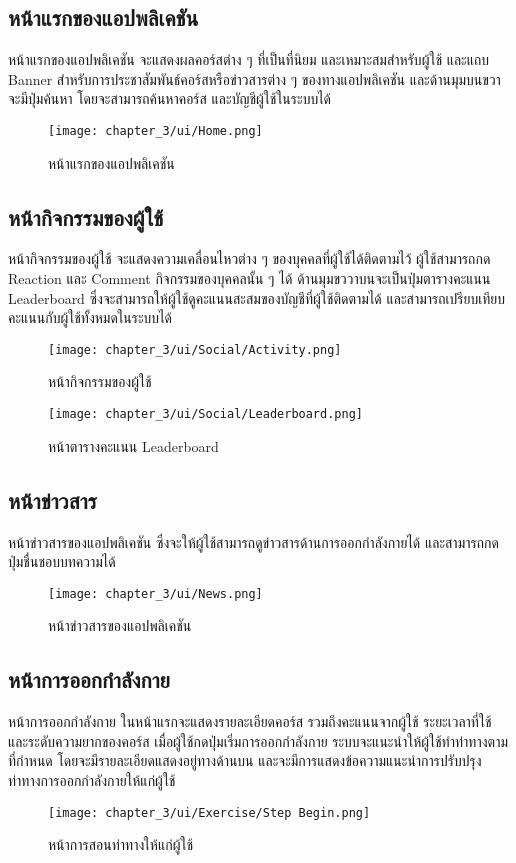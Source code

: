 \subsection{หน้าแรกของแอปพลิเคชัน}
หน้าแรกของแอปพลิเคชัน จะแสดงผลคอร์สต่าง ๆ ที่เป็นที่นิยม และเหมาะสมสำหรับผู้ใช้ และแถบ Banner สำหรับการประชาสัมพันธ์คอร์สหรือข่าวสารต่าง ๆ ของทางแอปพลิเคชัน และด้านมุมบนขวาจะมีปุ่มค้นหา โดยจะสามารถค้นหาคอร์ส และบัญชีผู้ใช้ในระบบได้
\begin{figure}
    \texttt{[image: chapter\_3/ui/Home.png]}
    \caption{หน้าแรกของแอปพลิเคชัน}
\end{figure}

\subsection{หน้ากิจกรรมของผู้ใช้}
หน้ากิจกรรมของผู้ใช้ จะแสดงความเคลื่อนไหวต่าง ๆ ของบุคคลที่ผู้ใช้ได้ติดตามไว้ ผู้ใช้สามารถกด Reaction และ Comment กิจกรรมของบุคคลนั้น ๆ ได้ ด้านมุมขววาบนจะเป็นปุ่มตารางคะแนน Leaderboard ซึ่งจะสามารถให้ผู้ใช้ดูคะแนนสะสมของบัญชีที่ผู้ใช้ติดตามได้ และสามารถเปรียบเทียบคะแนนกับผู้ใช้ทั้งหมดในระบบได้
\begin{figure}
    \texttt{[image: chapter\_3/ui/Social/Activity.png]}
    \caption{หน้ากิจกรรมของผู้ใช้}
\end{figure}
\begin{figure}
    \texttt{[image: chapter\_3/ui/Social/Leaderboard.png]}
    \caption{หน้าตารางคะแนน Leaderboard}
\end{figure}

\subsection{หน้าข่าวสาร}
หน้าข่าวสารของแอปพลิเคชัน ซึ่งจะให้ผู้ใช้สามารถดูข่าวสารด้านการออกกำลังกายได้ และสามารถกดปุ่มชื่นชอบบทความได้
\begin{figure}
    \texttt{[image: chapter\_3/ui/News.png]}
    \caption{หน้าข่าวสารของแอปพลิเคชัน}
\end{figure}

\subsection{หน้าการออกกำลังกาย}
หน้าการออกกำลังกาย ในหน้าแรกจะแสดงรายละเอียดคอร์ส รวมถึงคะแนนจากผู้ใช้ ระยะเวลาที่ใช้ และระดับความยากของคอร์ส เมื่อผู้ใช้กดปุ่มเริ่มการออกกำลังกาย ระบบจะแนะนำให้ผู้ใช้ทำท่าทางตามที่กำหนด โดยจะมีรายละเอียดแสดงอยู่ทางด้านบน และจะมีการแสดงข้อความแนะนำการปรับปรุงท่าทางการออกกำลังกายให้แก่ผู้ใช้
\begin{figure}
    \texttt{[image: chapter\_3/ui/Exercise/Step Begin.png]}
    \caption{หน้าการสอนท่าทางให้แก่ผู้ใช้}
\end{figure}


